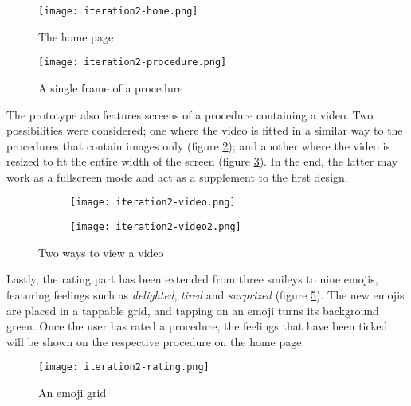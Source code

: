 \begin{figure}
    \centering
    \begin{minipage}{0.45\textwidth}
        \centering
        \texttt{[image: iteration2-home.png]}
        \caption{The home page}
        \label{fig:i2-home}
    \end{minipage}
    \begin{minipage}{0.45\textwidth}
        \centering
        \texttt{[image: iteration2-procedure.png]}
        \caption{A single frame of a procedure}
        \label{fig:i2-procedure}
    \end{minipage}
\end{figure}

The prototype also features screens of a procedure containing a video. Two possibilities were considered; one where the video is fitted in a similar way to the procedures that contain images only (figure \ref{fig:i2-video-standard}); and another where the video is resized to fit the entire width of the screen (figure \ref{fig:i2-video-fullscreen}). In the end, the latter may work as a fullscreen mode and act as a supplement to the first design.

\begin{figure}
    \centering
    \begin{subfigure}{0.45\textwidth}
        \centering
        \texttt{[image: iteration2-video.png]}
        \label{fig:i2-video-standard}
    \end{subfigure}
    \begin{subfigure}{0.45\textwidth}
        \centering
        \texttt{[image: iteration2-video2.png]}
        \label{fig:i2-video-fullscreen}
    \end{subfigure}
    \caption{Two ways to view a video}
    \label{fig:i2-video}
\end{figure}

Lastly, the rating part has been extended from three smileys to nine emojis, featuring feelings such as \emph{delighted}, \emph{tired} and \emph{surprized} (figure \ref{fig:i2-rating}). The new emojis are placed in a tappable grid, and tapping on an emoji turns its background green. Once the user has rated a procedure, the feelings that have been ticked will be shown on the respective procedure on the home page.

\begin{figure}
    \centering
    \texttt{[image: iteration2-rating.png]}
    \caption{An emoji grid}
    \label{fig:i2-rating}
\end{figure}

